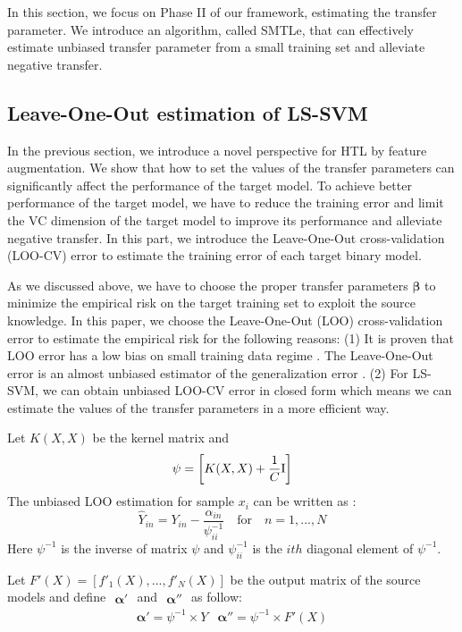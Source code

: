 In this section, we focus on Phase II of our framework, estimating the transfer parameter. We introduce an algorithm, called SMTLe, that can effectively estimate unbiased transfer parameter from a small training set and alleviate negative transfer. 

\subsection{Leave-One-Out estimation of LS-SVM }
In the previous section, we introduce a novel perspective for HTL by feature augmentation. We show that how to set the values of the transfer parameters can significantly affect the performance of the target model. To achieve better performance of the target model, we have to reduce the training error and limit the VC dimension of the target model to improve its performance and alleviate negative transfer. In this part, we introduce the Leave-One-Out cross-validation  (LOO-CV) error to estimate the training error of each target binary model.


As we discussed above, we have to choose the proper transfer parameters $\boldsymbol{\beta}$ to minimize the empirical risk on the target training set to exploit the source knowledge.
In this paper, we choose the Leave-One-Out (LOO) cross-validation error to estimate the empirical risk for the following reasons: (1) It is proven that LOO error has a low bias on small training data regime \cite{kuzborskij2013stability}. The Leave-One-Out error is an almost unbiased estimator of the generalization error \cite{elisseeff2003leave}. (2) For LS-SVM, we can obtain unbiased LOO-CV error in closed form which means we can estimate the values of the transfer parameters in a more efficient way.

Let $K(X,X)$ be the kernel matrix and
\begin{equation}\label{eq:linear}
\psi=\left[ 
{K(X,X) + \frac{1}{C}{\rm{I}}} \right]
\end{equation}
The unbiased LOO estimation for sample $x_i$ can be written as \cite{cawley2006leave}:
\begin{equation} \label{eq:loo}
{\hat Y_{in}} = {Y_{in}} - \frac{{{\alpha _{in}}}}{{\psi_{ii}^{ - 1}}}\quad {\text{for}}\quad n = 1,...,N
\end{equation}
Here $\psi^{-1}$ is the inverse of matrix $\psi$ and  $\psi_{ii}^{-1}$ is the $ith$ diagonal element of $\psi^{-1}$. 

Let $F'(X)=\left[f'_1(X),...,f'_N(X)\right]$ be the output matrix of the source models and define $\begin{array}{c}\boldsymbol{\alpha'} \end{array}$ and $\begin{array}{c}\boldsymbol{\alpha}''\end{array}$ as follow:
\begin{equation}
\begin{array}{cc}
\boldsymbol{\alpha'} =\psi^{-1} \times Y & \boldsymbol{\alpha''} =\psi^{-1} \times F'(X)
\end{array}
\end{equation}

